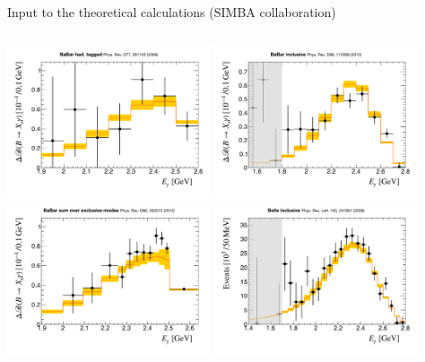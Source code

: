 \documentclass[xcolor=dvipsnames]{beamer}
\begin{document}
\begin{frame}{Input to the theoretical calculations (SIMBA collaboration)}
\centering\scriptsize

\vspace{10pt}

\begin{columns}
   \centering
   \centering\scriptsize

   \includegraphics[width=0.45\textwidth]{figures/babar_hadtag_spec_default_la055_a3.pdf}
   \includegraphics[width=0.45\textwidth]{figures/babar_incl_spec_default_la055_a3.pdf}
   \includegraphics[width=0.45\textwidth]{figures/babar_sem_spec_default_la055_a3.pdf}
   \includegraphics[width=0.45\textwidth]{figures/belle_spec_default_la055_a3.pdf}
   

\end{columns}
\end{frame}
\end{document}
